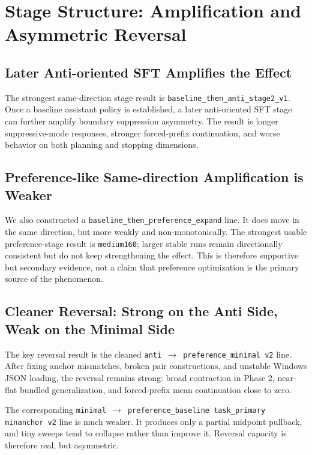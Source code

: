 \documentclass[11pt]{article}
\begin{document}
\section{Stage Structure: Amplification and Asymmetric Reversal}
\label{sec:stages}

\subsection{Later Anti-oriented SFT Amplifies the Effect}

The strongest same-direction stage result is \texttt{baseline\_then\_anti\_stage2\_v1}. Once a baseline assistant policy is established, a later anti-oriented SFT stage can further amplify boundary suppression asymmetry. The result is longer suppressive-mode responses, stronger forced-prefix continuation, and worse behavior on both planning and stopping dimensions.

\subsection{Preference-like Same-direction Amplification is Weaker}

We also constructed a \texttt{baseline\_then\_preference\_expand} line. It does move in the same direction, but more weakly and non-monotonically. The strongest usable preference-stage result is \texttt{medium160}; larger stable runs remain directionally consistent but do not keep strengthening the effect. This is therefore supportive but secondary evidence, not a claim that preference optimization is the primary source of the phenomenon.

\subsection{Cleaner Reversal: Strong on the Anti Side, Weak on the Minimal Side}

The key reversal result is the cleaned \texttt{anti $\rightarrow$ preference\_minimal v2} line. After fixing anchor mismatches, broken pair constructions, and unstable Windows JSON loading, the reversal remains strong: broad contraction in Phase 2, near-flat bundled generalization, and forced-prefix mean continuation close to zero.

The corresponding \texttt{minimal $\rightarrow$ preference\_baseline task\_primary minanchor v2} line is much weaker. It produces only a partial midpoint pullback, and tiny sweeps tend to collapse rather than improve it. Reversal capacity is therefore real, but asymmetric.
\end{document}
